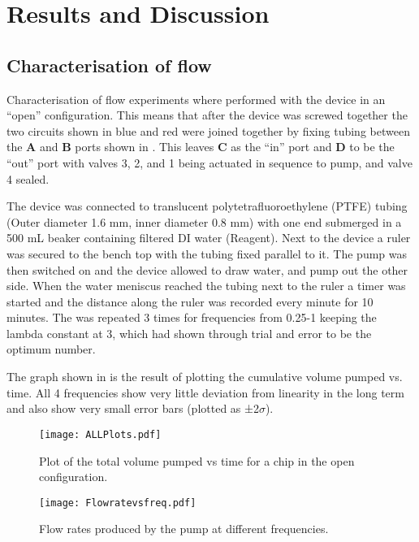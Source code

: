 \section{Results and Discussion}

\subsection{Characterisation of flow}

Characterisation of flow experiments where performed with the device in an “open”
configuration. This means that after the device was screwed together the two circuits shown
in blue and red were joined together by fixing tubing between the \textbf{A} and \textbf{B} ports shown in
. This leaves \textbf{C} as the “in” port and \textbf{D} to be the “out” port with valves 3, 2, and 1
being actuated in sequence to pump, and valve 4 sealed.

The device was connected to translucent polytetrafluoroethylene (PTFE) tubing (Outer
diameter 1.6 mm, inner diameter 0.8 mm) with one end submerged in a 500 mL beaker
containing filtered DI water (Reagent). Next to the device a ruler was secured to the bench
top with the tubing fixed parallel to it. The pump was then switched on and the device
allowed to draw water, and pump out the other side. When the water meniscus reached the tubing
next to the ruler a timer was started and the distance along the ruler was recorded every
minute for 10 minutes. The was repeated 3 times for frequencies from 0.25-1 keeping the
lambda constant at 3, which had shown through trial and error to be the optimum number.

The graph shown in  is the result of plotting the cumulative volume pumped
vs. time. All 4 frequencies show very little deviation from linearity in the
long term and also show very small error bars (plotted as ±2$\sigma$).

\begin{figure}[ht]
  \begin{center}
  \texttt{[image: ALLPlots.pdf]}
  \caption{Plot of the total volume pumped vs time for a chip in the open
  configuration.}
  \label{fig:Graph}
  \end{center}
\end{figure}

\begin{figure}[ht]
  \begin{center}
  \texttt{[image: Flowratevsfreq.pdf]}
  \caption{Flow rates produced by the pump at different frequencies.}
  \label{fig:FRvFGraph}
  \end{center}
\end{figure}

